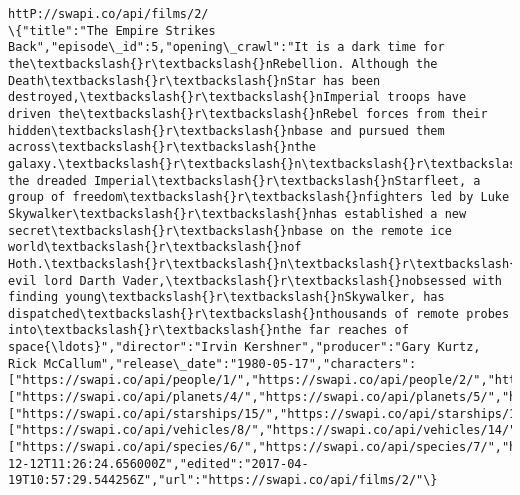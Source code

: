 \documentclass[11pt]{article}
\begin{document}
\begin{Verbatim}[commandchars=\\\{\}]
httP://swapi.co/api/films/2/
\{"title":"The Empire Strikes Back","episode\_id":5,"opening\_crawl":"It is a dark time for the\textbackslash{}r\textbackslash{}nRebellion. Although the Death\textbackslash{}r\textbackslash{}nStar has been destroyed,\textbackslash{}r\textbackslash{}nImperial troops have driven the\textbackslash{}r\textbackslash{}nRebel forces from their hidden\textbackslash{}r\textbackslash{}nbase and pursued them across\textbackslash{}r\textbackslash{}nthe galaxy.\textbackslash{}r\textbackslash{}n\textbackslash{}r\textbackslash{}nEvading the dreaded Imperial\textbackslash{}r\textbackslash{}nStarfleet, a group of freedom\textbackslash{}r\textbackslash{}nfighters led by Luke Skywalker\textbackslash{}r\textbackslash{}nhas established a new secret\textbackslash{}r\textbackslash{}nbase on the remote ice world\textbackslash{}r\textbackslash{}nof Hoth.\textbackslash{}r\textbackslash{}n\textbackslash{}r\textbackslash{}nThe evil lord Darth Vader,\textbackslash{}r\textbackslash{}nobsessed with finding young\textbackslash{}r\textbackslash{}nSkywalker, has dispatched\textbackslash{}r\textbackslash{}nthousands of remote probes into\textbackslash{}r\textbackslash{}nthe far reaches of space{\ldots}","director":"Irvin Kershner","producer":"Gary Kurtz, Rick McCallum","release\_date":"1980-05-17","characters":["https://swapi.co/api/people/1/","https://swapi.co/api/people/2/","https://swapi.co/api/people/3/","https://swapi.co/api/people/4/","https://swapi.co/api/people/5/","https://swapi.co/api/people/10/","https://swapi.co/api/people/13/","https://swapi.co/api/people/14/","https://swapi.co/api/people/18/","https://swapi.co/api/people/20/","https://swapi.co/api/people/21/","https://swapi.co/api/people/22/","https://swapi.co/api/people/23/","https://swapi.co/api/people/24/","https://swapi.co/api/people/25/","https://swapi.co/api/people/26/"],"planets":["https://swapi.co/api/planets/4/","https://swapi.co/api/planets/5/","https://swapi.co/api/planets/6/","https://swapi.co/api/planets/27/"],"starships":["https://swapi.co/api/starships/15/","https://swapi.co/api/starships/10/","https://swapi.co/api/starships/11/","https://swapi.co/api/starships/12/","https://swapi.co/api/starships/21/","https://swapi.co/api/starships/22/","https://swapi.co/api/starships/23/","https://swapi.co/api/starships/3/","https://swapi.co/api/starships/17/"],"vehicles":["https://swapi.co/api/vehicles/8/","https://swapi.co/api/vehicles/14/","https://swapi.co/api/vehicles/16/","https://swapi.co/api/vehicles/18/","https://swapi.co/api/vehicles/19/","https://swapi.co/api/vehicles/20/"],"species":["https://swapi.co/api/species/6/","https://swapi.co/api/species/7/","https://swapi.co/api/species/3/","https://swapi.co/api/species/2/","https://swapi.co/api/species/1/"],"created":"2014-12-12T11:26:24.656000Z","edited":"2017-04-19T10:57:29.544256Z","url":"https://swapi.co/api/films/2/"\}

\end{Verbatim}
\end{document}
